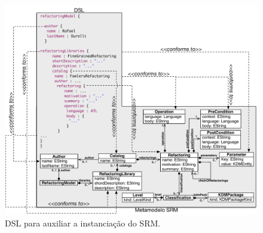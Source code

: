 
\begin{figure}[!h]
	\centering
	\caption{DSL para auxiliar a instanciação do SRM.}
	\label{fig:DSL_SRM}
	\includegraphics[scale=0.6]{images/MetaModelEDSL}
	\fautor
\end{figure}

